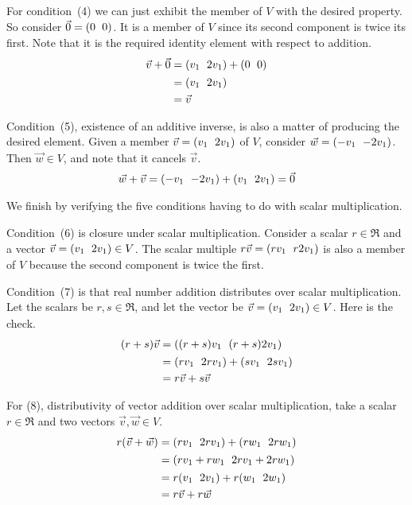 \documentclass[10pt,t]{beamer}
\begin{document}
\begin{frame}
\pause
For condition~(4) we can just exhibit the member of $V$ with the desired 
property. 
So consider $\zero=\rowvec{0 &0}$.
It is a member of $V$ since its second component is twice its first.
Note that it is the required identity element with respect to addition. 
\begin{align*}
  \vec{v}+\zero
  &=\rowvec{v_1 &2v_1}+\rowvec{0  &0}     \\
  &=\rowvec{v_1 &2v_1}    \\
  &=\vec{v}
\end{align*}
\end{frame}\begin{frame}
Condition~(5), existence of an additive inverse, is also a matter of 
producing the desired element.
Given a member $\vec{v}=\rowvec{v_1 &2v_1}$ of $V$, consider
$\vec{w}=\rowvec{-v_1 &-2v_1}$.
Then $\vec{w}\in V$, and note that it cancels $\vec{v}$.
\begin{equation*}
  \vec{w}+\vec{v}=\rowvec{-v_1 &-2v_1}+\rowvec{v_1 &2v_1}=\zero
\end{equation*}

\pause
We finish by verifying the five conditions having to do with scalar multiplication.


Condition~(6) is closure under scalar multiplication.
Consider a scalar $r\in\Re$ and a vector $\vec{v}=\rowvec{v_1 &2v_1}\in V$.
The scalar multiple $r\vec{v}=\rowvec{rv_1 &r2v_1}$ is also a member
of $V$ because the second component is twice the first.

\pause
Condition~(7) is that 
real number addition distributes over scalar multiplication.
Let the scalars be $r,s\in\Re$, and 
let the vector be $\vec{v}=\rowvec{v_1 &2v_1}\in V$.
Here is the check.
\begin{align*}
  (r+s)\vec{v} &= \rowvec{(r+s)v_1 &(r+s)2v_1}               \\
               &=\rowvec{rv_1 &2rv_1}+\rowvec{sv_1 &2sv_1}   \\
               &=r\vec{v}+s\vec{v}
\end{align*}
\end{frame}\begin{frame}
For (8),
distributivity of vector addition over scalar multiplication,
take a scalar $r\in\Re$ and 
two vectors $\vec{v},\vec{w}\in V$.
\begin{align*}
  r(\vec{v}+\vec{w}) &=\rowvec{rv_1 &2rv_1}+\rowvec{rw_1 &2rw_1}   \\
                     &=\rowvec{rv_1+rw_1 &2rv_1+2rw_1}           \\
                     &=r\rowvec{v_1 &2v_1}+r\rowvec{w_1 &2w_1}   \\
                     &=r\vec{v}+r\vec{w}
\end{align*}


\end{frame}
\end{document}
